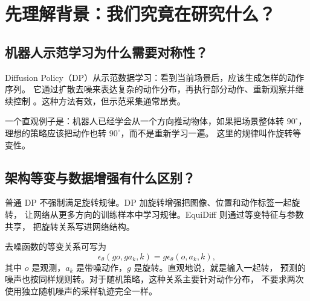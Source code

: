 \begin{abstract}
这份说明围绕三个问题展开：等变结构是否能帮助 Push-T 减少示范需求；
有了精确旋转增强，等变架构是否还有额外价值；当任务不满足对称性假设时，
这种约束会造成什么损失，以及如何修正。主实验表明，EquiDiff 在
100/200 条示范的固定预算比较中优于普通 DP，但在 25/50 条示范时，
没有充分证据支持稳定的低数据优势。精确增强在 25/50 条示范时更强，
而 200 条示范下的架构优势会随训练加长而缩小。
固定目标且状态输入不含目标时，错误等变约束造成明显性能下降；
显式目标输入与可学习门控可以部分恢复，但仍不及 DP。
因此，我们的结论是等变性具有明确的适用条件，而不是所有原始假设都成立。
以下结论来自已完成的 RQ1、RQ2、RQ3 和补充检查，不依赖可选 E4 的未完成结果。
\end{abstract}

\section{先理解背景：我们究竟在研究什么？}
\label{eqstudy:zh:background}
\subsection{机器人示范学习为什么需要对称性？}
Diffusion Policy（DP）从示范数据学习：看到当前场景后，应该生成怎样的动作序列。
它通过扩散去噪来表达复杂的动作分布，再执行部分动作、重新观察并继续控制
\cite{chi2023diffusion}。这种方法有效，但示范采集通常昂贵。

一个直观例子是：机器人已经学会从一个方向推动物体，如果把场景整体转
$90^\circ$，理想的策略应该把动作也转 $90^\circ$，而不是重新学习一遍。
这里的规律叫作旋转等变性。

\subsection{架构等变与数据增强有什么区别？}
普通 DP 不强制满足旋转规律。DP 加旋转增强把图像、位置和动作标签一起旋转，
让网络从更多方向的训练样本中学习规律。EquiDiff 则通过等变特征与参数共享，
把旋转关系写进网络结构\cite{wang2024equivariant}。

去噪函数的等变关系可写为
\begin{equation}
\epsilon_\theta(g o,g a_k,k)=g\epsilon_\theta(o,a_k,k),
\label{eqstudy:zh:equivariance}
\end{equation}
其中 $o$ 是观测，$a_k$ 是带噪动作，$g$ 是旋转。直观地说，就是输入一起转，
预测的噪声也按同样规则转。对于随机策略，这种关系主要针对动作分布，
不要求两次使用独立随机噪声的采样轨迹完全一样。

